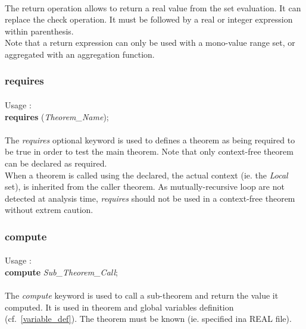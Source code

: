 \paragraph{}
The return operation allows to return a real value from the 
set evaluation. It can replace the check operation. It must 
be followed by a real or integer expression within parenthesis.\\
Note that a return expression can only be used with a mono-value
range set, or aggregated with an aggregation function.

\subsubsection {requires}

\label {requires_kw}

\paragraph{}
Usage :\\
\textbf {requires} (\textit{Theorem\_Name});

\paragraph{}
The \textit{requires} optional keyword is used to defines a 
theorem as being required to be true in order to test the main 
theorem. Note that only context-free theorem can be declared as 
required.\\
When a theorem is called using the declared, the actual context 
(ie. the \textit{Local} set), is inherited from the caller 
theorem. As mutually-recursive loop are not detected at analysis 
time, \textit{requires} should not be used in a context-free 
theorem without extrem caution.


\subsubsection {compute}

\label {compute_kw}

\paragraph{}
Usage :\\
\textbf {compute} \textit{Sub\_Theorem\_Call};

\paragraph{}
The \textit{compute} keyword is used to call a sub-theorem
and return the value it computed. It is used in theorem and 
global variables definition (cf.~\ref{variable_def}). The 
theorem must be known (ie. specified ina REAL file).

